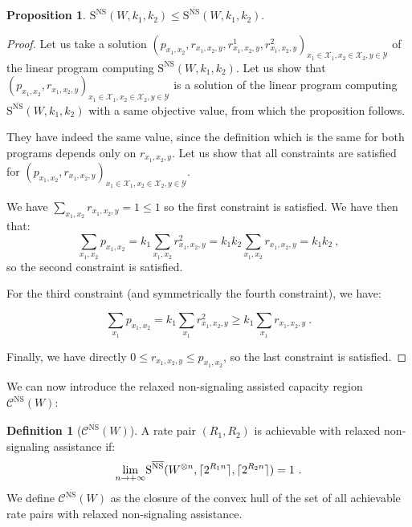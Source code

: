 \documentclass[11pt]{article}
\theoremstyle{definition}
\newtheorem{prop}[theo]{Proposition}
\newtheorem{defi}[theo]{Definition}
\theoremstyle{remark}
\DeclarePairedDelimiter\ceil{\lceil}{\rceil}
\begin{document}
  \begin{prop}
    \label{prop:NSisrelaxed}
   $\mathrm{S}^{\mathrm{NS}}(W,k_1,k_2) \leq \mathrm{S}^{\overline{\mathrm{NS}}}(W,k_1,k_2)$.
  \end{prop}
  \begin{proof}
    Let us take a solution $(p_{x_1,x_2}, r_{x_1,x_2,y}, r^1_{x_1,x_2,y}, r^2_{x_1,x_2,y})_{x_1 \in \mathcal{X}_1,x_2 \in \mathcal{X}_2,y \in \mathcal{Y}}$ of the linear program computing $\mathrm{S}^{\mathrm{NS}}(W,k_1,k_2)$. Let us show that $(p_{x_1,x_2}, r_{x_1,x_2,y})_{x_1 \in \mathcal{X}_1,x_2 \in \mathcal{X}_2,y \in \mathcal{Y}}$ is a solution of the linear program computing $\mathrm{S}^{\overline{\mathrm{NS}}}(W,k_1,k_2)$ with a same objective value, from which the proposition follows.

    They have indeed the same value, since the definition which is the same for both programs depends only on $r_{x_1,x_2,y}$. Let us show that all constraints are satisfied for $(p_{x_1,x_2}, r_{x_1,x_2,y})_{x_1 \in \mathcal{X}_1,x_2 \in \mathcal{X}_2,y \in \mathcal{Y}}$.

    We have $\sum_{x_1,x_2} r_{x_1,x_2,y} = 1 \leq 1$ so the first constraint is satisfied. We have then that:
    \[\sum_{x_1,x_2} p_{x_1,x_2} = k_1\sum_{x_1,x_2} r^2_{x_1,x_2,y} = k_1k_2\sum_{x_1,x_2} r_{x_1,x_2,y} = k_1k_2 \ ,\]
    so the second constraint is satisfied.

    For the third constraint (and symmetrically the fourth constraint), we have:

    \[\sum_{x_1} p_{x_1,x_2} = k_1\sum_{x_1} r^2_{x_1,x_2,y} \geq  k_1\sum_{x_1} r_{x_1,x_2,y} \ .\]

    Finally, we have directly $0 \leq r_{x_1,x_2,y} \leq p_{x_1,x_2}$, so the last constraint is satisfied.
  \end{proof}

  We can now introduce the relaxed non-signaling assisted capacity region $\mathcal{C}^{\overline{\mathrm{NS}}}(W)$:
  \begin{defi}[$\mathcal{C}^{\overline{\mathrm{NS}}}(W)$]
  A rate pair $(R_1,R_2)$ is achievable with relaxed non-signaling assistance if:
  \[ \underset{n \rightarrow +\infty}{\lim} \mathrm{S}^{\overline{\mathrm{NS}}}(W^{\otimes n},\ceil{2^{R_1n}},\ceil{2^{R_2n}}) = 1 \ . \]
  We define $\mathcal{C}^{\overline{\mathrm{NS}}}(W)$ as the closure of the convex hull of the set of all achievable rate pairs with relaxed non-signaling assistance.
  \end{defi}
\end{document}
